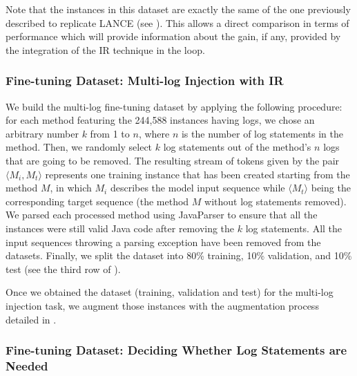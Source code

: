 Note that the instances in this dataset are exactly the same of the one previously described to replicate LANCE (see ). This allows a direct comparison in terms of performance which will provide information about the gain, if any, provided by the integration of the IR technique in the loop.

\subsubsection{Fine-tuning Dataset: Multi-log Injection with IR} \label{sec:multi-log-dataset}

We build the multi-log fine-tuning dataset by applying the following procedure: for each method featuring the 244,588 instances having logs, we chose an arbitrary number $k$ from 1 to $n$, where $n$ is the number of log statements in the method. Then, we randomly select $k$ log statements out of the method's $n$ logs that are going to be removed. 
The resulting stream of tokens given by the pair $\langle M_i, M_t \rangle$ represents one training instance that has been created starting from the method $M$, in which $M_i$ describes the model input sequence while $\langle M_t \rangle$ being  the corresponding target sequence (\ie the method $M$ without log statements removed). 
We parsed each processed method using JavaParser \cite{javaparser} to ensure that all the instances were still valid Java code after removing the $k$ log statements. 
All the input sequences throwing a parsing exception have been removed from the datasets. Finally, we split the dataset into 80\% training, 10\% validation, and 10\% test (see the third row of ).

Once we obtained the dataset (\ie training, validation and test) for the multi-log injection task, we augment those instances with the augmentation process detailed in .

\subsubsection{Fine-tuning Dataset: Deciding Whether Log Statements are Needed} \label{sec:predicting-dataset}

